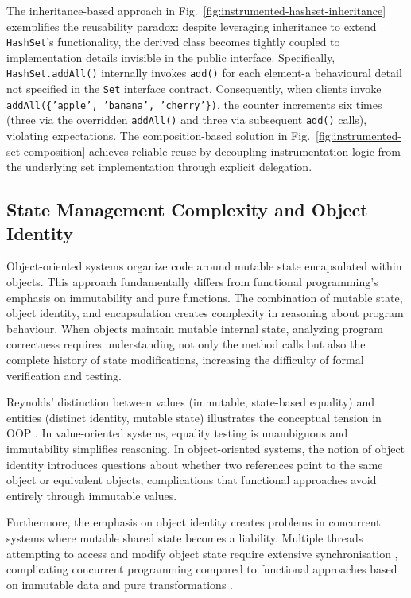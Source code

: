 The inheritance-based approach in Fig.~\ref{fig:instrumented-hashset-inheritance} exemplifies the reusability paradox: despite leveraging inheritance to extend \texttt{HashSet}'s functionality, the derived class becomes tightly coupled to implementation details invisible in the public interface. Specifically, \texttt{HashSet.addAll()} internally invokes \texttt{add()} for each element-a behavioural detail not specified in the \texttt{Set} interface contract. Consequently, when clients invoke \texttt{addAll(\{'apple', 'banana', 'cherry'\})}, the counter increments six times (three via the overridden \texttt{addAll()} and three via subsequent \texttt{add()} calls), violating expectations. The composition-based solution in Fig.~\ref{fig:instrumented-set-composition} achieves reliable reuse by decoupling instrumentation logic from the underlying set implementation through explicit delegation.

\subsection{State Management Complexity and Object Identity}

Object-oriented systems organize code around mutable state encapsulated within objects. This approach fundamentally differs from functional programming's emphasis on immutability and pure functions. The combination of mutable state, object identity, and encapsulation creates complexity in reasoning about program behaviour. When objects maintain mutable internal state, analyzing program correctness requires understanding not only the method calls but also the complete history of state modifications, increasing the difficulty of formal verification and testing.

Reynolds' distinction between values (immutable, state-based equality) and entities (distinct identity, mutable state) illustrates the conceptual tension in OOP \cite{reynolds1985three}. In value-oriented systems, equality testing is unambiguous and immutability simplifies reasoning. In object-oriented systems, the notion of object identity introduces questions about whether two references point to the same object or equivalent objects, complications that functional approaches avoid entirely through immutable values.

Furthermore, the emphasis on object identity creates problems in concurrent systems where mutable shared state becomes a liability. Multiple threads attempting to access and modify object state require extensive synchronisation , complicating concurrent programming compared to functional approaches based on immutable data and pure transformations \cite{reynolds1985three}.

